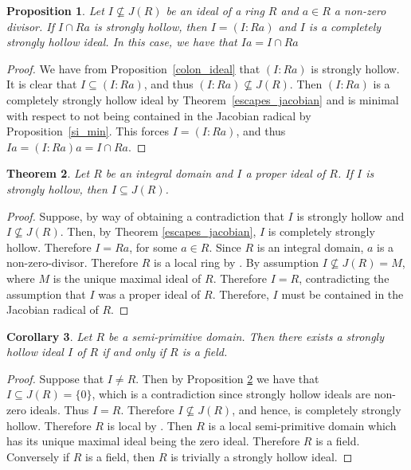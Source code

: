 \documentclass[11pt,english]{amsart}
\newtheorem{theorem}{Theorem}[section]
\newtheorem{proposition}[theorem]{Proposition}
\newtheorem{corollary}[theorem]{Corollary}
\theoremstyle{definition}
\numberwithin{equation}{section}
\theoremstyle{remark}
\begin{document}
\begin{proposition}
    Let $I\not\subseteq J(R)$ be an ideal of a ring $R$ and $a\in R$ a non-zero divisor. If $I\cap Ra$ is strongly hollow, then $I=(I:Ra)$ and $I$ is a completely strongly hollow ideal. In this case, we have that $Ia=I\cap Ra$
\end{proposition}

\begin{proof}
    We have from Proposition~\ref{colon_ideal} that $(I:Ra)$ is strongly hollow. It is clear that $I\subseteq (I:Ra)$, and thus $(I:Ra)\not\subseteq J(R)$. Then $(I:Ra)$ is a completely strongly hollow ideal by Theorem~\ref{escapes_jacobian} and is minimal with respect to not being contained in the Jacobian radical by Proposition~\ref{si_min}. This forces $I=(I:Ra)$, and thus $Ia=(I:Ra)a=I\cap Ra$.
\end{proof}

\begin{theorem}\label{int_domain_radical}
    Let $R$ be an integral domain and $I$ a proper ideal of $R$. If $I$ is strongly hollow, then $I\subseteq J(R)$. 
\end{theorem}

\begin{proof}
    Suppose, by way of obtaining a contradiction that $I$ is strongly hollow and $I\not\subseteq J(R)$. Then, by Theorem \ref{escapes_jacobian}, $I$ is completely strongly hollow. Therefore $I=Ra$, for some $a\in R$. Since $R$ is an integral domain, $a$ is a non-zero-divisor. Therefore $R$ is a local ring by \cite[Proposition.~1.9]{Rostami2021}. By assumption $I\not\subseteq J(R)=M$, where $M$ is the unique maximal ideal of $R$. Therefore $I=R$, contradicting the assumption that $I$ was a proper ideal of $R$. Therefore, $I$ must be contained in the Jacobian radical of $R$. 
\end{proof}

\begin{corollary}\label{cont}
    Let $R$ be a semi-primitive domain. Then there exists a strongly hollow ideal $I$ of $R$ if and only if $R$ is a field. 
\end{corollary}

\begin{proof}
    Suppose that $I\neq R$. Then by Proposition \ref{int_domain_radical} we have that $I\subseteq J(R)=\{0\}$, which is a contradiction since strongly hollow ideals are non-zero ideals. Thus $I=R$. Therefore $I\not\subseteq J(R)$, and hence, is completely strongly hollow. Therefore $R$ is local by \cite[Proposition.~1.12]{Rostami2021}. Then $R$ is a local semi-primitive domain which has its unique maximal ideal being the zero ideal. Therefore $R$ is a field. Conversely if $R$ is a field, then $R$ is trivially a strongly hollow ideal.
\end{proof}
\end{document}
